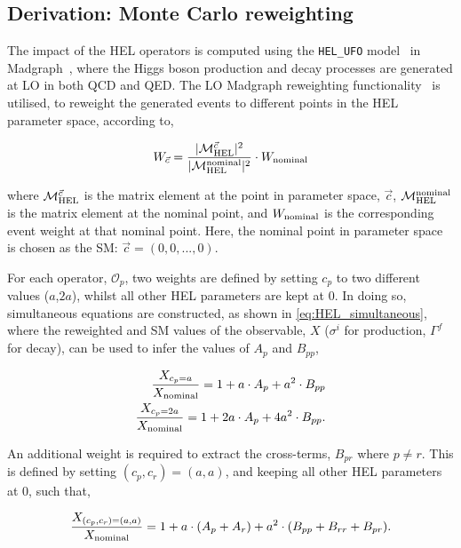 \subsection{Derivation: Monte Carlo reweighting}\label{sec:hel_derivation}
The impact of the HEL operators is computed using the \texttt{HEL\_UFO} model~\cite{Alloul:2013naa} in Madgraph~\cite{Alwall:2014hca}, where the Higgs boson production and decay processes are generated at LO in both QCD and QED. The LO Madgraph reweighting functionality~\cite{Mattelaer:2016gcx} is utilised, to reweight the generated events to different points in the HEL parameter space, according to,

\begin{equation}
    W_{\vec{c}} = \frac{|\mathcal{M}^{\vec{c}}_{\rm{HEL}}|^2}{|\mathcal{M}^{\rm{nominal}}_{\rm{HEL}}|^2} \cdot W_{\rm{nominal}}
\end{equation}

\noindent
where $\mathcal{M}^{\vec{c}}_{\rm{HEL}}$ is the matrix element at the point in parameter space, $\vec{c}$, $\mathcal{M}^{\rm{nominal}}_{\rm{HEL}}$ is the matrix element at the nominal point, and $W_{\rm{nominal}}$ is the corresponding event weight at that nominal point. Here, the nominal point in parameter space is chosen as the SM: $\vec{c} = (0,0,...,0)$.

For each operator, $\mathcal{O}_p$, two weights are defined by setting $c_p$ to two different values ($a$,$2a$), whilst all other HEL parameters are kept at 0. In doing so, simultaneous equations are constructed, as shown in \ref{eq:HEL_simultaneous}, where the reweighted and SM values of the observable, $X$ ($\sigma^i$ for production, $\Gamma^f$ for decay), can be used to infer the values of $A_p$ and $B_{pp}$,

\begin{equation}\label{eq:HEL_simultaneous}
    \begin{split}
        \frac{X_{c_p=a}}{X_{\rm{nominal}}} = 1 + a \cdot A_p + a^2 \cdot B_{pp} \\
        \frac{X_{c_p=2a}}{X_{\rm{nominal}}} = 1 + 2a \cdot A_p + 4a^2 \cdot B_{pp}.
    \end{split}
\end{equation}

\noindent
An additional weight is required to extract the cross-terms, $B_{pr}$ where $p \neq r$. This is defined by setting $(c_p,c_r)=(a,a)$, and keeping all other HEL parameters at 0, such that,

\begin{equation}
    \frac{X_{(c_p,c_r)=(a,a)}}{X_{\rm{nominal}}} = 1 + a \cdot (A_p+A_r) + a^2 \cdot (B_{pp}+B_{rr}+B_{pr}).
\end{equation}

